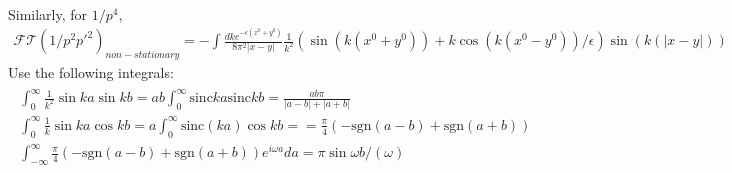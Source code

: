 \documentclass[aps,preprintnumbers,superscriptaddress,longbibliography]{revtex4-1}
\begin{document}
Similarly, for $1/p^4$,
\begin{align}
 \mathcal{FT}(1/p^2p'^2)_{non-stationary}= -  \int\frac{dke^{-\epsilon (x^0+y^0)}}{8\pi^2|x-y|}\frac{1}{k^2}(\sin(k(x^0+y^0))+k\cos(k(x^0-y^0))/\epsilon)\sin{(k(|x-y|))}
\end{align}
Use the following integrals:
\begin{align}
\begin{split}
    \int^\infty_0 \frac{1}{k^2}\sin{ka}\sin{kb}=ab\int^\infty_0 \text{sinc}ka \text{sinc}kb=\frac{ab\pi}{|a-b|+|a+b| }&\\ \int^\infty_0 \frac{1}{k}\sin{ka}\cos{kb}=a\int^\infty_0 \text{sinc} (ka)\cos{kb}==\frac{\pi}{4}(-\text{sgn}(a-b)+\text{sgn}(a+b)) &\\\int^{\infty}_{-\infty}\frac{\pi}{4}(-\text{sgn}(a-b)+\text{sgn}(a+b))e^{i\omega a}da=\pi\sin{\omega b}/(\omega)
   \end{split}
\end{align}
\end{document}
